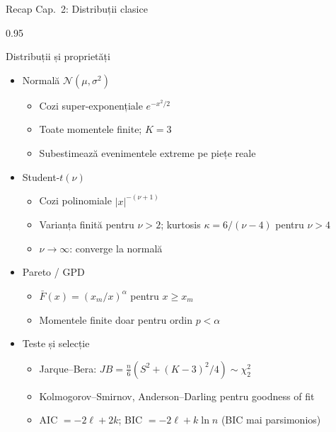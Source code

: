 \documentclass[9pt, aspectratio=169, t]{beamer}
\begin{document}
\begin{frame}[shrink=25]{Recap Cap.~2: Distribuții clasice}
\begin{cminipage}{0.95\textwidth}
\begin{block}{Distribuții și proprietăți}
\begin{itemize}\setlength{\itemsep}{0pt}
    \item Normală $\mathcal{N}(\mu, \sigma^2)$
    \begin{itemize}\setlength{\itemsep}{0pt}
        \item Cozi super-exponențiale $e^{-x^2/2}$
        \item Toate momentele finite; $K = 3$
        \item Subestimează evenimentele extreme pe piețe reale
    \end{itemize}
    \item Student-$t(\nu)$
    \begin{itemize}\setlength{\itemsep}{0pt}
        \item Cozi polinomiale $|x|^{-(\nu+1)}$
        \item Varianța finită pentru $\nu > 2$; kurtosis $\kappa = 6/(\nu-4)$ pentru $\nu > 4$
        \item $\nu \to \infty$: converge la normală
    \end{itemize}
    \item Pareto / GPD
    \begin{itemize}\setlength{\itemsep}{0pt}
        \item $\bar F(x) = (x_m/x)^\alpha$ pentru $x \ge x_m$
        \item Momentele finite doar pentru ordin $p < \alpha$
    \end{itemize}
    \item Teste și selecție
    \begin{itemize}\setlength{\itemsep}{0pt}
        \item Jarque--Bera: $JB = \frac{n}{6}(S^2 + (K-3)^2/4) \sim \chi^2_2$
        \item Kolmogorov--Smirnov, Anderson--Darling pentru goodness of fit
        \item AIC $= -2\ell + 2k$; BIC $= -2\ell + k\ln n$ (BIC mai parsimonios)
    \end{itemize}
\end{itemize}
\end{block}
\end{cminipage}
\end{frame}
\end{document}
